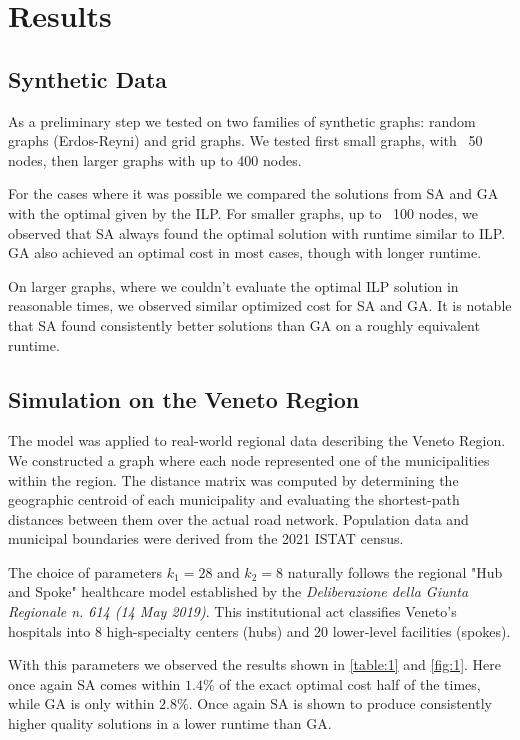 \documentclass[a4paper,11pt, twocolumn]{article}
\begin{document}
\section{Results}

\subsection{Synthetic Data}
As a preliminary step we tested on two families of synthetic graphs: random graphs (Erdos-Reyni) and grid graphs.
We tested first small graphs, with ~50 nodes, then larger graphs with up to 400 nodes.

For the cases where it was possible we compared the solutions from SA and GA with the optimal given by the ILP.
For smaller graphs, up to ~100 nodes, we observed that SA always found the optimal solution with runtime similar to ILP. GA also achieved an optimal cost in most cases, though with longer runtime.

On larger graphs, where we couldn't evaluate the optimal ILP solution in reasonable times, we observed similar optimized cost for SA and GA.
It is notable that SA found consistently better solutions than GA on a roughly equivalent runtime.

\subsection{Simulation on the Veneto Region}

The model was applied to real-world regional data describing the Veneto Region. We constructed a graph where each node represented one of the municipalities within the region. The distance matrix was computed by determining the geographic centroid of each municipality and evaluating the shortest-path distances between them over the actual road network. Population data and municipal boundaries were derived from the 2021 ISTAT census.

The choice of parameters $k_1 = 28$ and $k_2 = 8$ naturally follows the regional "Hub and Spoke" healthcare model established by the \textit{Deliberazione della Giunta Regionale n. 614 (14 May 2019)}. This institutional act classifies Veneto's hospitals into 8 high-specialty centers (hubs) and 20 lower-level facilities (spokes).

With this parameters we observed the results shown in \autoref{table:1} and \autoref{fig:1}. %
Here once again SA comes within $1.4\%$ of the exact optimal cost half of the times, while GA is only within $2.8\%$. Once again SA is shown to produce consistently higher quality solutions in a lower runtime than GA.
\end{document}
